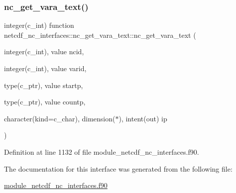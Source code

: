 \subsubsection{\texorpdfstring{nc\+\_\+get\+\_\+vara\+\_\+text()}{nc\_get\_vara\_text()}}
{\footnotesize\ttfamily integer(c\+\_\+int) function netcdf\+\_\+nc\+\_\+interfaces\+::nc\+\_\+get\+\_\+vara\+\_\+text\+::nc\+\_\+get\+\_\+vara\+\_\+text (\begin{DoxyParamCaption}\item[{integer(c\+\_\+int), value}]{ncid,  }\item[{integer(c\+\_\+int), value}]{varid,  }\item[{type(c\+\_\+ptr), value}]{startp,  }\item[{type(c\+\_\+ptr), value}]{countp,  }\item[{character(kind=c\+\_\+char), dimension($\ast$), intent(out)}]{ip }\end{DoxyParamCaption})}



Definition at line 1132 of file module\+\_\+netcdf\+\_\+nc\+\_\+interfaces.\+f90.



The documentation for this interface was generated from the following file\+:\begin{DoxyCompactItemize}
\item 
\hyperlink{module__netcdf__nc__interfaces_8f90}{module\+\_\+netcdf\+\_\+nc\+\_\+interfaces.\+f90}\end{DoxyCompactItemize}
